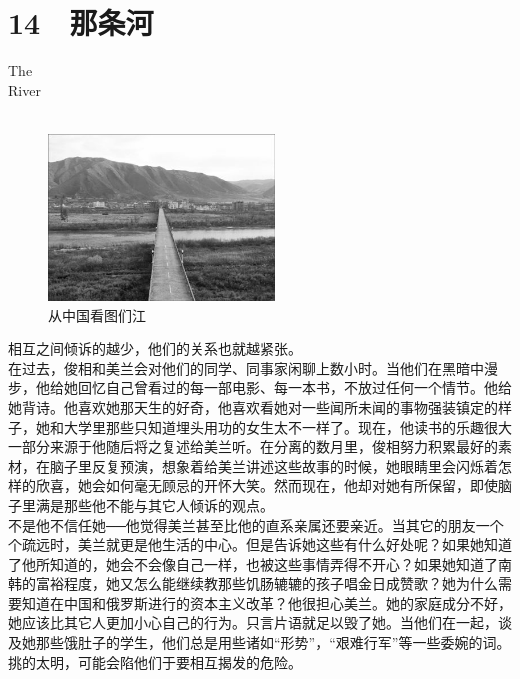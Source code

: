 \fancyhead[RO]{{\tiny{\textcolor{Gray}{\FA \ }}}\thepage}
\fancyhead[LE]{{\tiny{\textcolor{Gray}{\FA \ }}}\thepage}
\fancyfoot[LE,RO]{}
\fancyfoot[LO,CE]{}
\fancyfoot[CO,RE]{}
\chapter*{14 {\FA } 那条河}
\vspace{5mm}
\begin{flushright}
	\textcolor{PinYinColor}{\EN \huge{The\\
	River\\
	\ \\}}
\end{flushright}
\begin{figure}[!htbp]
\centering
\includegraphics[width=6cm]{./Chapters/Images/14.jpg}
\caption*{从中国看图们江}
\end{figure}


相互之间倾诉的越少，他们的关系也就越紧张。\\

在过去，俊相和美兰会对他们的同学、同事家闲聊上数小时。当他们在黑暗中漫步，他给她回忆自己曾看过的每一部电影、每一本书，不放过任何一个情节。他给她背诗。他喜欢她那天生的好奇，他喜欢看她对一些闻所未闻的事物强装镇定的样子，她和大学里那些只知道埋头用功的女生太不一样了。现在，他读书的乐趣很大一部分来源于他随后将之复述给美兰听。在分离的数月里，俊相努力积累最好的素材，在脑子里反复预演，想象着给美兰讲述这些故事的时候，她眼睛里会闪烁着怎样的欣喜，她会如何毫无顾忌的开怀大笑。然而现在，他却对她有所保留，即使脑子里满是那些他不能与其它人倾诉的观点。\\

不是他不信任她──他觉得美兰甚至比他的直系亲属还要亲近。当其它的朋友一个个疏远时，美兰就更是他生活的中心。但是告诉她这些有什么好处呢？如果她知道了他所知道的，她会不会像自己一样，也被这些事情弄得不开心？如果她知道了南韩的富裕程度，她又怎么能继续教那些饥肠辘辘的孩子唱金日成赞歌？她为什么需要知道在中国和俄罗斯进行的资本主义改革？他很担心美兰。她的家庭成分不好，她应该比其它人更加小心自己的行为。只言片语就足以毁了她。当他们在一起，谈及她那些饿肚子的学生，他们总是用些诸如“形势”，“艰难行军”等一些委婉的词。挑的太明，可能会陷他们于要相互揭发的危险。\\

